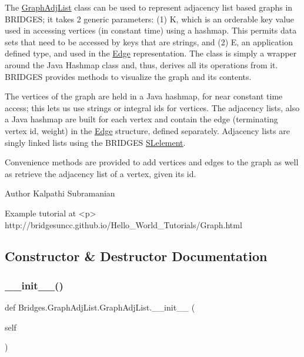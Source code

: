 The \mbox{\hyperlink{class_bridges_1_1_graph_adj_list_1_1_graph_adj_list}{Graph\+Adj\+List}} class can be used to represent adjacency list based graphs in B\+R\+I\+D\+G\+ES; it takes 2 generic parameters\+: (1) K, which is an orderable key value used in accessing vertices (in constant time) using a hashmap. This permits data sets that need to be accessed by keys that are strings, and (2) E, an application defined type, and used in the \mbox{\hyperlink{namespace_bridges_1_1_edge}{Edge}} representation. The class is simply a wrapper around the Java Hashmap class and, thus, derives all its operations from it. B\+R\+I\+D\+G\+ES provides methods to visualize the graph and its contents.

The vertices of the graph are held in a Java hashmap, for near constant time access; this lets us use strings or integral ids for vertices. The adjacency lists, also a Java hashmap are built for each vertex and contain the edge (terminating vertex id, weight) in the \mbox{\hyperlink{namespace_bridges_1_1_edge}{Edge}} structure, defined separately. Adjacency lists are singly linked lists using the B\+R\+I\+D\+G\+ES \mbox{\hyperlink{namespace_bridges_1_1_s_lelement}{S\+Lelement}}.

Convenience methods are provided to add vertices and edges to the graph as well as retrieve the adjacency list of a vertex, given its id.

\begin{DoxyAuthor}{Author}
Kalpathi Subramanian
\end{DoxyAuthor}
\begin{DoxyVerb}\sa Example tutorial at <p>
    http://bridgesuncc.github.io/Hello_World_Tutorials/Graph.html\end{DoxyVerb}
 

\subsection{Constructor \& Destructor Documentation}
\mbox{\label{class_bridges_1_1_graph_adj_list_1_1_graph_adj_list_ad87576232d34f60705dc8fc15028ccc9}} 
\subsubsection{\texorpdfstring{\+\_\+\+\_\+init\+\_\+\+\_\+()}{\_\_init\_\_()}}
{\footnotesize\ttfamily def Bridges.\+Graph\+Adj\+List.\+Graph\+Adj\+List.\+\_\+\+\_\+init\+\_\+\+\_\+ (\begin{DoxyParamCaption}\item[{}]{self }\end{DoxyParamCaption})}



